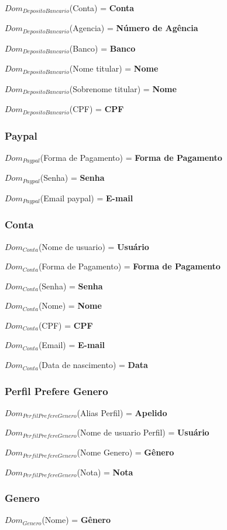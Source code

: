 \documentclass[12pt,a4paper]{article}
\newcommand{\createdomain}[3]{
    $Dom_{#1}$(#2) = {\bf #3}
}
\begin{document}
        \createdomain{Deposito Bancario}{Conta}{Conta}

        \createdomain{Deposito Bancario}{Agencia}{Número de Agência}

        \createdomain{Deposito Bancario}{Banco}{Banco}

        \createdomain{Deposito Bancario}{Nome titular}{Nome}

        \createdomain{Deposito Bancario}{Sobrenome titular}{Nome}

        \createdomain{Deposito Bancario}{CPF}{CPF}


    \subsubsection{Paypal}
        \createdomain{Paypal}{Forma de Pagamento}{Forma de Pagamento}

        \createdomain{Paypal}{Senha}{Senha}

        \createdomain{Paypal}{Email paypal}{E-mail}


    \subsubsection{Conta}
        \createdomain{Conta}{Nome de usuario}{Usuário}

        \createdomain{Conta}{Forma de Pagamento}{Forma de Pagamento}

        \createdomain{Conta}{Senha}{Senha}

        \createdomain{Conta}{Nome}{Nome}

        \createdomain{Conta}{CPF}{CPF}

        \createdomain{Conta}{Email}{E-mail}

        \createdomain{Conta}{Data de nascimento}{Data}


    \subsubsection{Perfil Prefere Genero}
        \createdomain{Perfil Prefere Genero}{Alias Perfil}{Apelido}

        \createdomain{Perfil Prefere Genero}{Nome de usuario Perfil}{Usuário}

        \createdomain{Perfil Prefere Genero}{Nome Genero}{Gênero}

        \createdomain{Perfil Prefere Genero}{Nota}{Nota}


    \subsubsection{Genero}
        \createdomain{Genero}{Nome}{Gênero}
\end{document}
